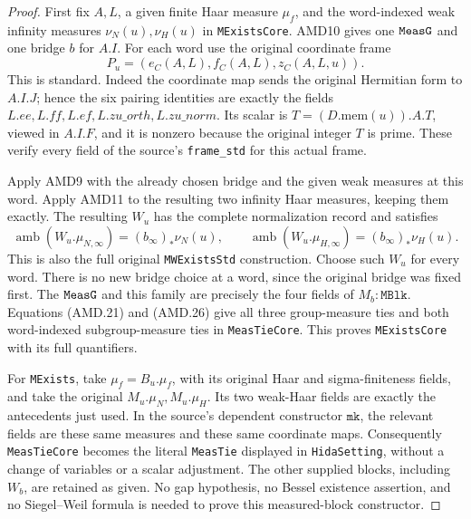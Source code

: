\documentclass[11pt,a4paper]{article}
\numberwithin{equation}{section}
\theoremstyle{remark}\newtheorem{remark}[theorem]{Remark}
\begin{document}
\begin{proof}
First fix \(A,L\), a given finite Haar measure \(\mu_f\),
and the word-indexed weak infinity measures
\(\nu_N(u),\nu_H(u)\) in \texttt{MExists\allowbreak Core}.  AMD10 gives
one \(\texttt{Meas\allowbreak G}\) and one bridge \(b\) for \(A.I\).
For each word use the original coordinate frame
\[
       P_u=(e_C(A,L),f_C(A,L),z_C(A,L,u)).
 \tag{AMD.25}
\]
This is standard.  Indeed the coordinate map sends the original
Hermitian form to \(A.I.J\); hence the six pairing identities
are exactly the fields \(L.ee,L.ff,L.ef,L.zu\_\allowbreak orth,L.zu\_\allowbreak norm\).
Its scalar is \(T=(D.\mathrm{mem}(u)).A.T\), viewed in \(A.I.F\),
and it is nonzero because the original integer \(T\) is prime.
These verify every field of the source's \texttt{frame\_\allowbreak std}
for this actual frame.

Apply AMD9 with the already chosen bridge and the given weak
measures at this word.  Apply AMD11 to the resulting two
infinity Haar measures, keeping them exactly.  The resulting
\(W_u\) has the complete normalization record and satisfies
\[
 \operatorname{amb}(W_u.\mu_{N,\infty})
                   =(b_\infty)_*\nu_N(u),\qquad
 \operatorname{amb}(W_u.\mu_{H,\infty})
                   =(b_\infty)_*\nu_H(u).
 \tag{AMD.26}
\]
This is also the full original \texttt{MWExists\allowbreak Std} construction.
Choose such \(W_u\) for every word.  There is no new bridge
choice at a word, since the original bridge was fixed first.
The \(\texttt{Meas\allowbreak G}\) and this family are precisely the
four fields of \(M_b:\texttt{MBlk}\).  Equations (AMD.21)
and (AMD.26) give all three group-measure ties and both
word-indexed subgroup-measure ties in \texttt{Meas\allowbreak Tie\allowbreak Core}.
This proves \texttt{MExists\allowbreak Core} with its full quantifiers.

For \texttt{MExists}, take \(\mu_f=B_u.\mu_f\), with its
original Haar and sigma-finiteness fields, and take the original
\(M_u.\mu_N,M_u.\mu_H\).  Its two weak-Haar fields are
exactly the antecedents just used.  In the source's dependent
constructor \(\texttt{mk}\), the relevant fields are these
same measures and these same coordinate maps.  Consequently
\texttt{Meas\allowbreak Tie\allowbreak Core} becomes the literal \texttt{Meas\allowbreak Tie}
displayed in \texttt{Hida\allowbreak Setting}, without a change of variables
or a scalar adjustment.  The other supplied blocks, including
\(W_b\), are retained as given.  No gap hypothesis, no Bessel
existence assertion, and no Siegel--Weil formula is needed to
prove this measured-block constructor.
\end{proof}
\end{document}
